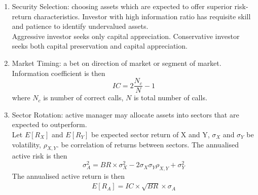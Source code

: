 \begin{remark} 
\begin{enumerate}[label=\roman*.]
\setlength{\itemsep}{0pt}
\item Security Selection: choosing assets which are expected to offer superior risk-return characteristics. Investor with high information ratio has requisite skill and patience to identify undervalued assets.\\
Aggressive investor seeks only capital appreciation. Conservative investor seeks both capital preservation and capital appreciation.
\item Market Timing: a bet on direction of market or segment of market. Information coefficient is then
\begin{equation}
IC = 2 \frac{N_c}{N} - 1 \nonumber
\end{equation}
where $N_c$ is number of correct calls, $N$ is total number of calls.
\item Sector Rotation: active manager may allocate assets into sectors that are expected to outperform.\\
Let $E[R_X]$ and $E[R_Y]$ be expected sector return of X and Y, $\sigma_X$ and $\sigma_Y$ be volatility, $\rho_{X,Y}$. be correlation of returns between sectors. The annualised active risk is then
\begin{equation}
\sigma_A^2 = BR \times \sigma_X^2 - 2 \sigma_X \sigma_Y \rho_{X,Y} + \sigma_Y^2 \nonumber
\end{equation}
The annualised active return is then
\begin{align}
E[R_A] = IC \times \sqrt{BR} \times \sigma_A \nonumber
\end{align}
\end{enumerate}
\end{remark}

